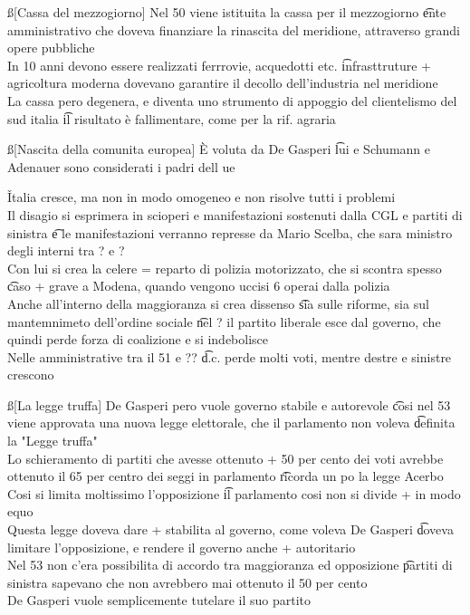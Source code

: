 \documentclass[12pt]{article}
\begin{document}
\ss[Cassa del mezzogiorno]
Nel 50 viene istituita la cassa per il mezzogiorno \t ente amministrativo che doveva finanziare la rinascita del meridione, attraverso grandi opere pubbliche \\
In 10 anni devono essere realizzati ferrrovie, acquedotti etc. \t infrasttruture + agricoltura moderna dovevano garantire il decollo dell'industria nel meridione \\
La cassa pero degenera, e diventa uno strumento di appoggio del clientelismo del sud italia \t il risultato è fallimentare, come per la rif. agraria

\ss[Nascita della comunita europea]
È voluta da De Gasperi \t lui e Schumann e Adenauer sono considerati i padri dell ue

\v

Italia cresce, ma non in modo omogeneo e non risolve tutti i problemi \\
Il disagio si esprimera in scioperi e manifestazioni sostenuti dalla CGL e partiti di sinistra \t e le manifestazioni verranno represse da Mario Scelba, che sara ministro degli interni tra ? e ? \\
Con lui si crea la celere = reparto di polizia motorizzato, che si scontra spesso \t caso + grave a Modena, quando vengono uccisi 6 operai dalla polizia \\
Anche all'interno della maggioranza si crea dissenso \t sia sulle riforme, sia sul mantemnimeto dell'ordine sociale \t nel ? il partito liberale esce dal governo, che quindi perde forza di coalizione e si indebolisce \\
Nelle amministrative tra il 51 e ?? \t d.c. perde molti voti, mentre destre e sinistre crescono

\ss[La legge truffa]
De Gasperi pero vuole governo stabile e autorevole \t cosi nel 53 viene approvata una nuova legge elettorale, che il parlamento non voleva \t definita la "Legge truffa" \\
Lo schieramento di partiti che avesse ottenuto + 50 per cento dei voti avrebbe ottenuto il 65 per centro dei seggi in parlamento \t ricorda un po la legge Acerbo \\
Cosi si limita moltissimo l'opposizione \t il parlamento cosi non si divide + in modo equo \\
Questa legge doveva dare + stabilita al governo, come voleva De Gasperi \t doveva limitare l'opposizione, e rendere il governo anche + autoritario \\
Nel 53 non c'era possibilita di accordo tra maggioranza ed opposizione \t partiti di sinistra sapevano che non avrebbero mai ottenuto il 50 per cento \\
De Gasperi vuole semplicemente tutelare il suo partito
\end{document}
